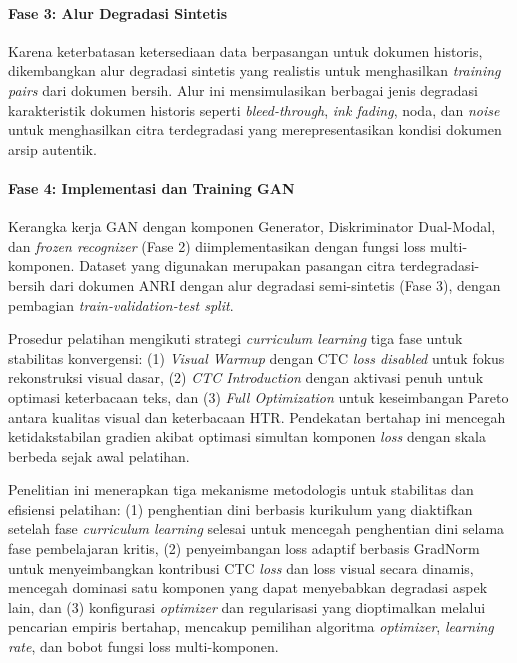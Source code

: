 \documentclass[12pt,a4paper]{article}
\begin{document}
\paragraph{Fase 3: Alur Degradasi Sintetis}
Karena keterbatasan ketersediaan data berpasangan untuk dokumen historis, dikembangkan alur degradasi sintetis yang realistis untuk menghasilkan \textit{training pairs} dari dokumen bersih. Alur ini mensimulasikan berbagai jenis degradasi karakteristik dokumen historis seperti \textit{bleed-through}, \textit{ink fading}, noda, dan \textit{noise} untuk menghasilkan citra terdegradasi yang merepresentasikan kondisi dokumen arsip autentik.

\paragraph{Fase 4: Implementasi dan Training GAN}
Kerangka kerja GAN dengan komponen Generator, Diskriminator Dual-Modal, dan \textit{frozen recognizer} (Fase 2) diimplementasikan dengan fungsi loss multi-komponen. Dataset yang digunakan merupakan pasangan citra terdegradasi-bersih dari dokumen ANRI dengan alur degradasi semi-sintetis (Fase 3), dengan pembagian \textit{train-validation-test split}.

Prosedur pelatihan mengikuti strategi \textit{curriculum learning} tiga fase untuk stabilitas konvergensi: (1) \textit{Visual Warmup} dengan CTC \textit{loss disabled} untuk fokus rekonstruksi visual dasar, (2) \textit{CTC Introduction} dengan aktivasi penuh untuk optimasi keterbacaan teks, dan (3) \textit{Full Optimization} untuk keseimbangan Pareto antara kualitas visual dan keterbacaan HTR. Pendekatan bertahap ini mencegah ketidakstabilan gradien akibat optimasi simultan komponen \textit{loss} dengan skala berbeda sejak awal pelatihan.

\setlength{\parskip}{0.5em}
Penelitian ini menerapkan tiga mekanisme metodologis untuk stabilitas dan efisiensi pelatihan: (1) penghentian dini berbasis kurikulum yang diaktifkan setelah fase \textit{curriculum learning} selesai untuk mencegah penghentian dini selama fase pembelajaran kritis, (2) penyeimbangan loss adaptif berbasis GradNorm untuk menyeimbangkan kontribusi CTC \textit{loss} dan loss visual secara dinamis, mencegah dominasi satu komponen yang dapat menyebabkan degradasi aspek lain, dan (3) konfigurasi \textit{optimizer} dan regularisasi yang dioptimalkan melalui pencarian empiris bertahap, mencakup pemilihan algoritma \textit{optimizer}, \textit{learning rate}, dan bobot fungsi loss multi-komponen.
\end{document}
